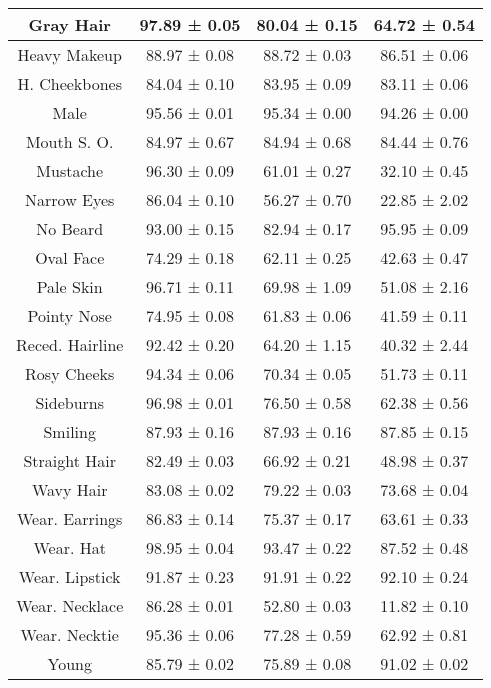 \begin{table*}[h]
{\begin{tabular}{|c|c|c|c|}
    Gray Hair          & 97.89 ± 0.05 & 80.04 ± 0.15 & 64.72 ± 0.54 \\ \hline
    Heavy Makeup       & 88.97 ± 0.08 & 88.72 ± 0.03 & 86.51 ± 0.06 \\ \hline
    H. Cheekbones      & 84.04 ± 0.10 & 83.95 ± 0.09 & 83.11 ± 0.06 \\ \hline
    Male               & 95.56 ± 0.01 & 95.34 ± 0.00 & 94.26 ± 0.00 \\ \hline
    Mouth S. O.        & 84.97 ± 0.67 & 84.94 ± 0.68 & 84.44 ± 0.76 \\ \hline
    Mustache           & 96.30 ± 0.09 & 61.01 ± 0.27 & 32.10 ± 0.45 \\ \hline
    Narrow Eyes        & 86.04 ± 0.10 & 56.27 ± 0.70 & 22.85 ± 2.02 \\ \hline
    No Beard           & 93.00 ± 0.15 & 82.94 ± 0.17 & 95.95 ± 0.09 \\ \hline
    Oval Face          & 74.29 ± 0.18 & 62.11 ± 0.25 & 42.63 ± 0.47 \\ \hline
    Pale Skin          & 96.71 ± 0.11 & 69.98 ± 1.09 & 51.08 ± 2.16 \\ \hline
    Pointy Nose        & 74.95 ± 0.08 & 61.83 ± 0.06 & 41.59 ± 0.11 \\ \hline
    Reced. Hairline    & 92.42 ± 0.20 & 64.20 ± 1.15 & 40.32 ± 2.44 \\ \hline
    Rosy Cheeks        & 94.34 ± 0.06 & 70.34 ± 0.05 & 51.73 ± 0.11 \\ \hline
    Sideburns          & 96.98 ± 0.01 & 76.50 ± 0.58 & 62.38 ± 0.56 \\ \hline
    Smiling            & 87.93 ± 0.16 & 87.93 ± 0.16 & 87.85 ± 0.15 \\ \hline
    Straight Hair      & 82.49 ± 0.03 & 66.92 ± 0.21 & 48.98 ± 0.37 \\ \hline
    Wavy Hair          & 83.08 ± 0.02 & 79.22 ± 0.03 & 73.68 ± 0.04 \\ \hline
    Wear. Earrings     & 86.83 ± 0.14 & 75.37 ± 0.17 & 63.61 ± 0.33 \\ \hline
    Wear. Hat          & 98.95 ± 0.04 & 93.47 ± 0.22 & 87.52 ± 0.48 \\ \hline
    Wear. Lipstick     & 91.87 ± 0.23 & 91.91 ± 0.22 & 92.10 ± 0.24 \\ \hline
    Wear. Necklace     & 86.28 ± 0.01 & 52.80 ± 0.03 & 11.82 ± 0.10 \\ \hline
    Wear. Necktie      & 95.36 ± 0.06 & 77.28 ± 0.59 & 62.92 ± 0.81 \\ \hline
    Young              & 85.79 ± 0.02 & 75.89 ± 0.08 & 91.02 ± 0.02 \\ \hline
    \end{tabular}
}
\vskip -0.1in
\end{table*}


